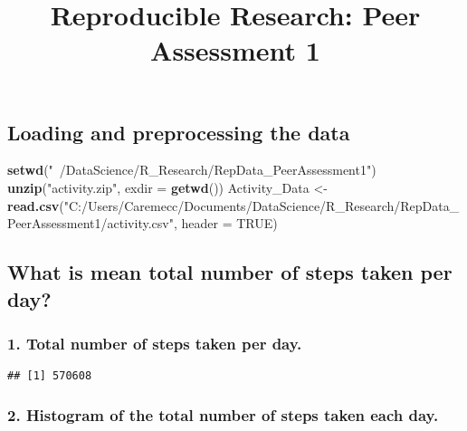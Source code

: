 \documentclass[]{article}
\title{Reproducible Research: Peer Assessment 1}
\author{}
\date{}
\newenvironment{Shaded}{\begin{snugshade}}{\end{snugshade}}
\newcommand{\KeywordTok}[1]{\textcolor[rgb]{0.13,0.29,0.53}{\textbf{#1}}}
\newcommand{\DataTypeTok}[1]{\textcolor[rgb]{0.13,0.29,0.53}{#1}}
\newcommand{\StringTok}[1]{\textcolor[rgb]{0.31,0.60,0.02}{#1}}
\newcommand{\OtherTok}[1]{\textcolor[rgb]{0.56,0.35,0.01}{#1}}
\newcommand{\OperatorTok}[1]{\textcolor[rgb]{0.81,0.36,0.00}{\textbf{#1}}}
\newcommand{\NormalTok}[1]{#1}
\begin{document}
\maketitle

\subsection{Loading and preprocessing the
data}\label{loading-and-preprocessing-the-data}

\begin{Shaded}
\begin{Highlighting}[]
\KeywordTok{setwd}\NormalTok{(}\StringTok{"~/DataScience/R_Research/RepData_PeerAssessment1"}\NormalTok{)}
\KeywordTok{unzip}\NormalTok{(}\StringTok{"activity.zip"}\NormalTok{, }\DataTypeTok{exdir =} \KeywordTok{getwd}\NormalTok{())}
\NormalTok{Activity_Data <-}\StringTok{ }\KeywordTok{read.csv}\NormalTok{(}\StringTok{"C:/Users/Caremecc/Documents/DataScience/R_Research/RepData_PeerAssessment1/activity.csv"}\NormalTok{, }\DataTypeTok{header =} \OtherTok{TRUE}\NormalTok{)}
\end{Highlighting}
\end{Shaded}

\subsection{What is mean total number of steps taken per
day?}\label{what-is-mean-total-number-of-steps-taken-per-day}

\subsubsection{1. Total number of steps taken per
day.}\label{total-number-of-steps-taken-per-day.}

\begin{Shaded}
\end{Shaded}

\begin{verbatim}
## [1] 570608
\end{verbatim}

\subsubsection{2. Histogram of the total number of steps taken each
day.}\label{histogram-of-the-total-number-of-steps-taken-each-day.}
\end{document}
